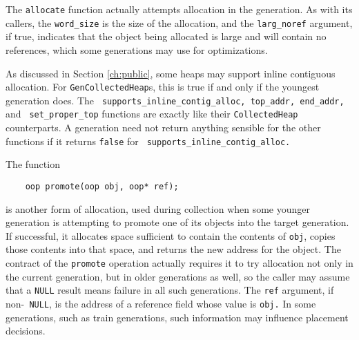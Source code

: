 \documentclass{article}
\begin{document}
The {\tt allocate} function actually attempts allocation in the
generation.  As with its callers, the {\tt word\_size} is the size of
the allocation, and the {\tt larg\_noref} argument, if true, indicates
that the object being allocated is large and will contain no
references, which some generations may use for optimizations.

As discussed in Section \ref{ch:public}, some heaps may support inline
contiguous allocation.  For {\tt GenCollectedHeap}s, this is true if
and only if the youngest generation does.  The {\tt
supports\_inline\_contig\_alloc, top\_addr, end\_addr,} and {\tt
set\_proper\_top} functions are exactly like their {\tt CollectedHeap}
counterparts.  A generation need not return anything sensible for the
other functions if it returns {\tt false} for {\tt
supports\_inline\_contig\_alloc.}

The function
\begin{verbatim}  
    oop promote(oop obj, oop* ref);
\end{verbatim}
is another form of allocation, used during collection when some
younger generation is attempting to promote one of its objects
into the target generation.  If successful, it allocates space
sufficient to contain the contents of {\tt obj}, copies those contents
into that space, and returns the new address for the object.  The
contract of the {\tt promote} operation actually requires it to try
allocation not only in the current generation, but in older
generations as well, so the
caller may assume that a {\tt NULL} result means failure in all such
generations.
The {\tt ref} argument, if non-{\tt
NULL}, is the address of a reference field whose value is {\tt obj.}
In some generations, such as train generations, such information may
influence placement decisions.
\end{document}
